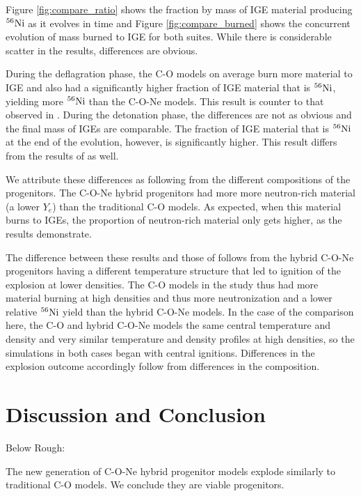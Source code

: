 \documentclass[iop,apj]{emulateapj}
\newcommand{\Ni}[1]{\ensuremath{{}^{#1}{\rm Ni}}}
\begin{document}
Figure \ref{fig:compare_ratio} shows the fraction by mass of IGE
material producing \Ni{56} as it evolves in time and Figure
\ref{fig:compare_burned} shows the concurrent evolution of mass
burned to IGE for both suites. While there is considerable
scatter in the results, differences are obvious. 

During the deflagration phase, the C-O models
on average burn more material to IGE and also had a significantly higher
fraction of IGE material that is \Ni{56}, yielding more \Ni{56} than
the C-O-Ne models. This result is counter to that observed in
\citet{willcoxetal2016}. During the detonation phase, the differences
are not as obvious and the final mass of IGEs are comparable. The
fraction of IGE material that is \Ni{56} at the end of the evolution,
however, is significantly higher. This result differs from 
the results of \citet{willcoxetal2016} as well.

We attribute these differences as following from the different
compositions of the progenitors. The C-O-Ne hybrid progenitors
had more more neutron-rich material (a lower $Y_e$) than the
traditional C-O models. As expected, when this material burns
to IGEs, the proportion of neutron-rich material only gets
higher, as the results demonstrate. 

The difference between these results and those of \citet{willcoxetal2016}
follows from the hybrid C-O-Ne progenitors having a different
temperature structure that led to ignition of the explosion at lower
densities. The C-O models in the \citet{willcoxetal2016} study
thus had more material burning at high densities and thus more
neutronization and a lower relative \Ni{56} yield than the
hybrid C-O-Ne models. In the case of the comparison here, the
C-O and hybrid C-O-Ne models {\color{red} the same central 
temperature and density and very similar temperature and density 
profiles at high densities, so the simulations in both cases 
began with central ignitions. Differences in the explosion outcome 
accordingly follow from differences in the composition.}

\section{Discussion and Conclusion}

Below Rough:

The new generation of C-O-Ne hybrid progenitor models explode similarly to
traditional C-O models. We conclude they are viable progenitors. 
\end{document}
